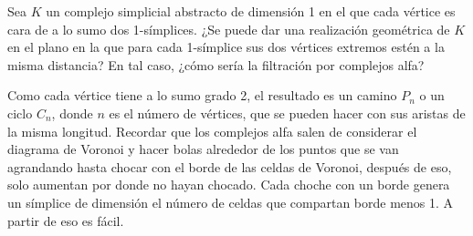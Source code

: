 \documentclass[twoside]{article}
\begin{document}
\newpage

\begin{ejercicio}{7}
Sea $K$ un complejo simplicial abstracto de dimensión 1 en el que cada vértice es cara de a lo
sumo dos 1-símplices. ¿Se puede dar una realización geométrica de $K$ en el plano en la que
para cada 1-símplice sus dos vértices extremos estén a la misma distancia? En tal caso, ¿cómo
sería la filtración por complejos alfa?
\end{ejercicio}
\begin{solucion}
Como cada vértice tiene a lo sumo grado 2, el resultado es un camino $P_n$ o un ciclo $C_n$, donde $n$ es el número de vértices, que se pueden hacer con sus aristas de la misma longitud. Recordar que los complejos alfa salen de considerar el diagrama de Voronoi y hacer bolas alrededor de los puntos que se van agrandando hasta chocar con el borde de las celdas de Voronoi, después de eso, solo aumentan por donde no hayan chocado. Cada choche con un borde genera un símplice de dimensión el número de celdas que compartan borde menos 1. A partir de eso es fácil.
\end{solucion}
\end{document}
